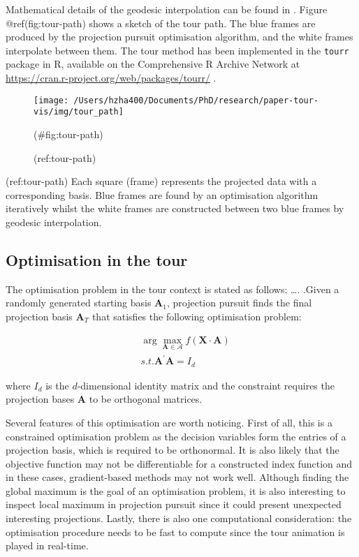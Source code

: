 Mathematical details of the geodesic interpolation can be found in \citet{buja2005computational}. Figure @ref(fig:tour-path) shows a sketch of the tour path. The blue frames are produced by the projection pursuit optimisation algorithm, and the white frames interpolate between them. The tour method has been implemented in the \texttt{tourr} package in R, available on the Comprehensive R Archive Network at \url{https://cran.r-project.org/web/packages/tourr/} \citep{wickham2011tourrpackage}.

\begin{Schunk}
\begin{figure}

{\centering \texttt{[image: /Users/hzha400/Documents/PhD/research/paper-tour-vis/img/tour\_path]} 

}

\caption[(ref:tour-path)]{(ref:tour-path)}(\#fig:tour-path)
\end{figure}
\end{Schunk}

(ref:tour-path) Each square (frame) represents the projected data with a corresponding basis. Blue frames are found by an optimisation algorithm iteratively whilst the white frames are constructed between two blue frames by geodesic interpolation.

\hypertarget{tour-optim}{%
\subsection{Optimisation in the tour}\label{tour-optim}}

The optimisation problem in the tour context is stated as follows:
\ldots.
.Given a randomly generated starting basis \(\mathbf{A}_1\), projection pursuit finds the final projection basis \(\mathbf{A}_T\) that satisfies the following optimisation problem:

\begin{align}
&\arg \max_{\mathbf{A} \in \mathcal{A}} f(\mathbf{X} \cdot \mathbf{A}) \\
&s.t.  \mathbf{A}^{\prime} \mathbf{A} = I_d
\end{align}

where \(I_d\) is the \(d\)-dimensional identity matrix and the constraint requires the projection bases \(\mathbf{A}\) to be orthogonal matrices.

Several features of this optimisation are worth noticing. First of all, this is a constrained optimisation problem as the decision variables form the entries of a projection basis, which is required to be orthonormal. It is also likely that the objective function may not be differentiable for a constructed index function and in these cases, gradient-based methods may not work well. Although finding the global maximum is the goal of an optimisation problem, it is also interesting to inspect local maximum in projection pursuit since it could present unexpected interesting projections. Lastly, there is also one computational consideration: the optimisation procedure needs to be fast to compute since the tour animation is played in real-time.

